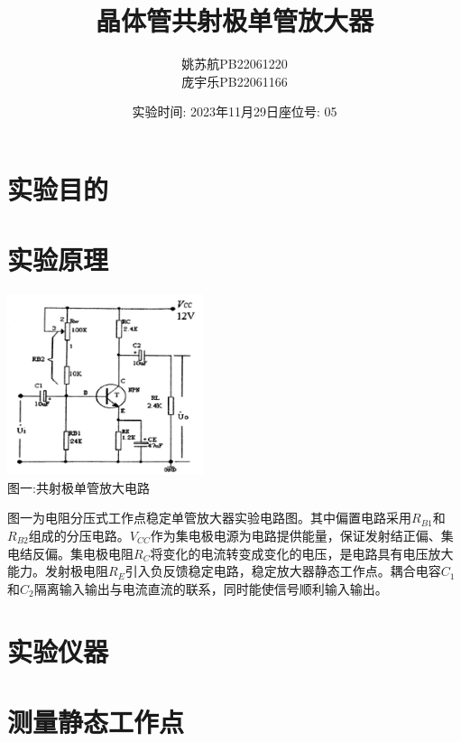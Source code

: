 \documentclass[a4paper]{article}
\title{\textbf{晶体管共射极单管放大器}}
\author{姚苏航\qquad PB22061220 \\ 庞宇乐\qquad PB22061166}
\date{实验时间: 2023年11月29日\qquad 座位号: 05}
\begin{document}
    \maketitle


    \section{实验目的}\label{sec:}





    \section{实验原理}\label{sec:10}
    \begin{center}
        \includegraphics[height=150pt]{AC}\\
        {\small 图一:共射极单管放大电路}
    \end{center}

    {{图一为电阻分压式工作点稳定单管放大器实验电路图。其中偏置电路采用$R_{B1}$和$R_{B2}$组成的分压电路。$V_{CC}$作为集电极电源为电路提供能量，保证发射结正偏、集电结反偏。集电极电阻$R_C$将变化的电流转变成变化的电压，是电路具有电压放大能力。发射极电阻$R_E$引入负反馈稳定电路，稳定放大器静态工作点。耦合电容$C_1$和$C_2$隔离输入输出与电流直流的联系，同时能使信号顺利输入输出。}}


    \section{实验仪器}\label{sec:2}


    \section{测量静态工作点}\label{sec:3}
\end{document}

